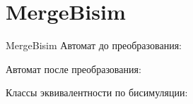 \section{MergeBisim}
\begin{frame}{MergeBisim}
	Автомат до преобразования:


	Автомат после преобразования:


	Классы эквивалентности по бисимуляции:


\end{frame}
